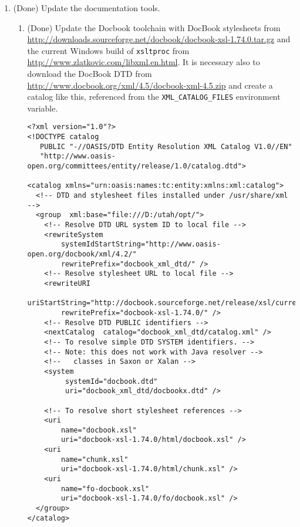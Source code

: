 \documentclass[11pt,letterpaper,onecolumn]{scrartcl}
\begin{document}
\begin{sloppypar}
\begin{enumerate}
	\item (Done) Update the documentation tools.
		\begin{enumerate}
	    \item (Done) Update the Docbook toolchain with DocBook stylesheets from \url{http://downloads.sourceforge.net/docbook/docbook-xsl-1.74.0.tar.gz} and the current Windows build of \texttt{xsltproc} from \url{http://www.zlatkovic.com/libxml.en.html}. It is necessary also to download the DocBook DTD from \url{http://www.docbook.org/xml/4.5/docbook-xml-4.5.zip} and create a catalog like this, referenced from the \verb|XML_CATALOG_FILES| environment variable.
	    
\begin{lstlisting}
<?xml version="1.0"?>
<!DOCTYPE catalog
   PUBLIC "-//OASIS/DTD Entity Resolution XML Catalog V1.0//EN"
   "http://www.oasis-open.org/committees/entity/release/1.0/catalog.dtd">

<catalog xmlns="urn:oasis:names:tc:entity:xmlns:xml:catalog">
  <!-- DTD and stylesheet files installed under /usr/share/xml -->
  <group  xml:base="file:///D:/utah/opt/">
    <!-- Resolve DTD URL system ID to local file -->
    <rewriteSystem
        systemIdStartString="http://www.oasis-open.org/docbook/xml/4.2/"
        rewritePrefix="docbook_xml_dtd/" />
    <!-- Resolve stylesheet URL to local file -->
    <rewriteURI
        uriStartString="http://docbook.sourceforge.net/release/xsl/current/"
        rewritePrefix="docbook-xsl-1.74.0/" />
    <!-- Resolve DTD PUBLIC identifiers -->
    <nextCatalog  catalog="docbook_xml_dtd/catalog.xml" />
    <!-- To resolve simple DTD SYSTEM identifiers. -->
    <!-- Note: this does not work with Java resolver -->
    <!--   classes in Saxon or Xalan -->
    <system
         systemId="docbook.dtd"
         uri="docbook_xml_dtd/docbookx.dtd" />

    <!-- To resolve short stylesheet references -->
    <uri
        name="docbook.xsl"
        uri="docbook-xsl-1.74.0/html/docbook.xsl" />
    <uri 
        name="chunk.xsl"
        uri="docbook-xsl-1.74.0/html/chunk.xsl" />
    <uri
        name="fo-docbook.xsl"
        uri="docbook-xsl-1.74.0/fo/docbook.xsl" />
  </group>
</catalog>
\end{lstlisting}
	    

\end{enumerate}
\end{enumerate}
\end{sloppypar}
\end{document}
